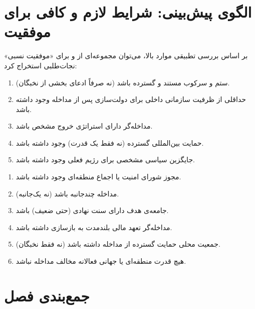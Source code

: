 \section{الگوی پیش‌بینی: شرایط لازم و کافی برای موفقیت}
\label{sec:ch03-prediction}

بر اساس بررسی تطبیقی موارد بالا، می‌توان مجموعه‌ای از  و  برای «موفقیت نسبی» نجات‌طلبی استخراج کرد:

\begin{tcolorbox}[successbox, title={شرایط لازم (همه باید برقرار باشند)}]
\begin{enumerate}[nosep, label=\textbf{ل\arabic*.}]
  \item ستم و سرکوب مستند و گسترده باشد (نه صرفاً ادعای بخشی از نخبگان).
  \item حداقلی از ظرفیت سازمانی داخلی برای دولت‌سازی پس از مداخله وجود داشته باشد.
  \item مداخله‌گر دارای استراتژی خروج مشخص باشد.
  \item حمایت بین‌المللی گسترده (نه فقط یک قدرت) وجود داشته باشد.
  \item جایگزین سیاسی مشخصی برای رژیم فعلی وجود داشته باشد.
\end{enumerate}
\end{tcolorbox}

\begin{tcolorbox}[defbox, title={شرایط کافی (حضور آنها احتمال موفقیت را به‌شدت افزایش می‌دهد)}]
\begin{enumerate}[nosep, label=\textbf{ک\arabic*.}]
  \item مجوز شورای امنیت یا اجماع منطقه‌ای وجود داشته باشد.
  \item مداخله چندجانبه باشد (نه یک‌جانبه).
  \item جامعه‌ی هدف دارای سنت نهادی (حتی ضعیف) باشد.
  \item مداخله‌گر تعهد مالی بلندمدت به بازسازی داشته باشد.
  \item جمعیت محلی حمایت گسترده از مداخله داشته باشد (نه فقط نخبگان).
  \item هیچ قدرت منطقه‌ای یا جهانی فعالانه مخالف مداخله نباشد.
\end{enumerate}
\end{tcolorbox}

\section{جمع‌بندی فصل}
\label{sec:ch03-summary}

